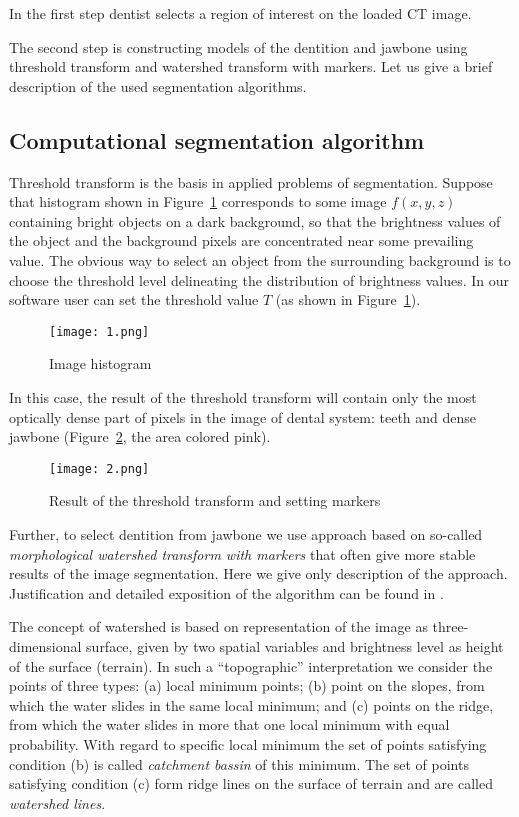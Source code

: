 \documentclass{elsarticle}
\begin{document}
In the first step dentist selects a region of interest on the
loaded CT image.

The second step is constructing models of the dentition and jawbone
using threshold transform and watershed transform with markers. Let us
give a brief description of the used segmentation algorithms.

\subsection{Computational segmentation algorithm} 
Threshold transform is the basis in applied problems of
segmentation. Suppose that histogram shown in Figure~\ref{fig:1}
corresponds to some image $f(x, y, z)$ containing bright objects on a
dark background, so that the brightness values of the object and the
background pixels are concentrated near some prevailing value. The
obvious way to select an object from the surrounding background is to
choose the threshold level delineating the distribution of brightness
values. In our software user can set the threshold value $T$ (as shown
in Figure~\ref{fig:1}). 
\begin{figure}[h]
  \centering
  \texttt{[image: 1.png]}
  \caption{Image histogram}
  \label{fig:1}
\end{figure}

In this case, the result of the threshold transform will contain only
the most optically dense part of pixels in the image of dental system:
teeth and dense jawbone (Figure~\ref{fig:2}, the area colored pink).
\begin{figure}[h]
  \centering
  \texttt{[image: 2.png]}
  \caption{Result of the threshold transform and setting markers}
  \label{fig:2}
\end{figure}

Further, to select dentition from jawbone we use approach based on
so-called \emph{morphological watershed transform with markers} that
often give more stable results of the image segmentation. Here we give
only description of the approach. Justification and detailed
exposition of the algorithm can be found in
\cite{GonsWoods,BeareLehmann2006}.

The concept of watershed is based on representation of the image as
three-dimensional surface, given by two spatial variables and
brightness level as height of the surface (terrain). In such a
``topographic'' interpretation we consider the points of three types:
(a) local minimum points; (b) point on the slopes, from which the
water slides in the same local minimum; and (c) points on the ridge,
from which the water slides in more that one local minimum with equal
probability. With regard to specific local minimum the set of points
satisfying condition (b) is called \emph{catchment bassin} of this
minimum. The set of points satisfying condition (c) form ridge lines
on the surface of terrain and are called \emph{watershed lines}.
\end{document}
